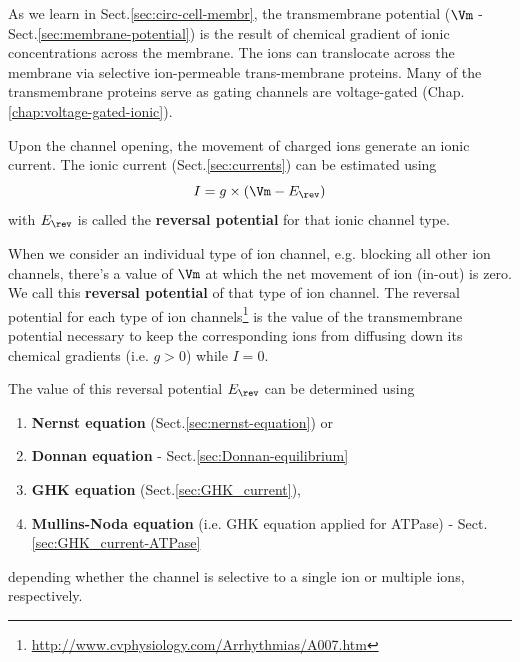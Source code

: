 As we learn in Sect.\ref{sec:circ-cell-membr}, the transmembrane potential
($\Vm$ - Sect.\ref{sec:membrane-potential}) is the result of chemical gradient
of ionic concentrations across the membrane.
The ions can translocate across the membrane via selective ion-permeable
trans-membrane proteins.  Many of the transmembrane proteins serve as gating
channels are voltage-gated (Chap.\ref{chap:voltage-gated-ionic}).

Upon the channel opening, the movement of charged ions generate an ionic
current.  The ionic current (Sect.\ref{sec:currents}) can be estimated using
\begin{equation}
I = g \times (\Vm - E_\rev)
\end{equation}
with $E_\rev$ is called the {\bf reversal potential} for that ionic channel
type.

When we consider an individual type of ion channel, e.g. blocking all
other ion channels, there's a value of $\Vm$ at which the net movement of ion
(in-out) is zero. We call this {\bf reversal potential} of that type of ion
channel.  The reversal potential for each type of ion
channels\footnote{\url{http://www.cvphysiology.com/Arrhythmias/A007.htm}} is the
value of the transmembrane potential necessary to keep the corresponding ions
from diffusing down its chemical gradients (i.e. $g>0$) while $I=0$.



The value of this reversal potential $E_\rev$ can be determined using 
\begin{enumerate}
  \item {\bf Nernst equation} (Sect.\ref{sec:nernst-equation}) or 
  
  \item {\bf Donnan equation} - Sect.\ref{sec:Donnan-equilibrium}
  
  \item {\bf GHK equation} (Sect.\ref{sec:GHK_current}), 
  
  \item {\bf Mullins-Noda equation} (i.e. GHK equation applied for ATPase) -
  Sect.\ref{sec:GHK_current-ATPase}
\end{enumerate}
depending whether the channel is selective to a single ion or multiple ions,
respectively.

